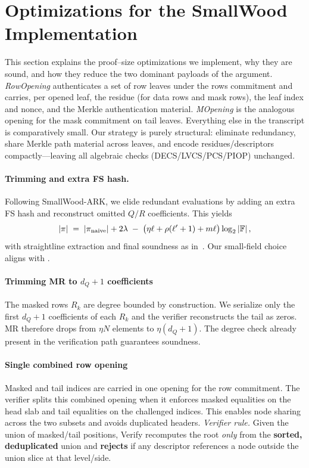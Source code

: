 \section{Optimizations for the SmallWood Implementation}\label{sec:optimisations}

This section explains the proof–size optimizations we implement, why they are sound, and how they reduce the two dominant payloads of the argument. 
\emph{RowOpening} authenticates a set of row leaves under the rows commitment and carries, per opened leaf, the residue (for data rows and mask rows), the leaf index and nonce, and the Merkle authentication material. 
\emph{MOpening} is the analogous opening for the mask commitment on tail leaves. 
Everything else in the transcript is comparatively small. 
Our strategy is purely structural: eliminate redundancy, share Merkle path material across leaves, and encode residues/descriptors compactly—leaving all algebraic checks (DECS/LVCS/PCS/PIOP) unchanged.


\paragraph{Trimming and extra FS hash.}
Following SmallWood-ARK, we elide redundant evaluations by adding an extra FS hash and reconstruct omitted $Q/R$ coefficients. This yields
$$
|\pi| \;=\; |\pi_{\mathrm{naive}}| + 2\lambda \;-\; \bigl(\eta \ell + \rho(\ell'+1) + m\ell \bigr)\log_2|\mathbb{F}|\,,
$$
with straightline extraction and final soundness as in~\cite[Thm.~9]{cryptoeprint:2025/1085}. Our small-field choice aligns with \cite[\S5.4, Tab.~2]{cryptoeprint:2025/1085}.


\paragraph{Trimming MR to \(d_Q{+}1\) coefficients}
The masked rows \(R_k\) are degree bounded by construction. We serialize only the first \(d_Q{+}1\) coefficients of each \(R_k\) and the verifier reconstructs the tail as zeros. MR therefore drops from \(\eta N\) elements to \(\eta(d_Q{+}1)\). The degree check already present in the verification path guarantees soundness.


\paragraph{Single combined row opening}
Masked and tail indices are carried in one opening for the row commitment. The verifier splits this combined opening when it enforces masked equalities on the head slab and tail equalities on the challenged indices. This enables node sharing across the two subsets and avoids duplicated headers.
\noindent\emph{Verifier rule.}
Given the union of masked/tail positions, \textsf{Verify} recomputes the root \emph{only} from the \textbf{sorted, deduplicated} union and \textbf{rejects} if any descriptor references a node outside the union slice at that level/side.

